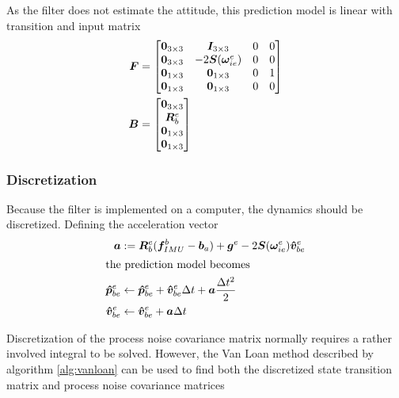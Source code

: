     As the filter does not estimate the attitude, this prediction model is linear with transition and input matrix
    \begin{align}
        \bm{F} &= 
        \begin{bmatrix}
            \bm{0}_{3\times3} & \bm{I}_{3\times3}          & 0 & 0\\
            \bm{0}_{3\times3} & -2\bm{S}(\bm{\omega}_{ie}^e) & 0 & 0\\
            \bm{0}_{1\times3} & \bm{0}_{1\times3}     & 0 & 1\\
            \bm{0}_{1\times3} & \bm{0}_{1\times3}     & 0 & 0
        \end{bmatrix}\\
        \bm{B} &= 
        \begin{bmatrix}
            \bm{0}_{3\times3}\\
            \bm{R}^e_b\\
            \bm{0}_{1\times3}\\
            \bm{0}_{1\times3}
        \end{bmatrix}
    \end{align}
    
\subsubsection{Discretization}
    Because the filter is implemented on a computer, the dynamics should be discretized. Defining the acceleration vector
    \begin{align}
        \bm{a} &:= \bm{R}^e_b(\bm{f}_{IMU}^b - \bm{b}_a) + \bm{g}^e - 2\bm{S}(\bm{\omega}_{ie}^e)\bm{\hat{v}}^e_{be}\\
        \intertext{the prediction model becomes}
        \bm{\hat{p}}^e_{be} &\leftarrow \bm{\hat{p}}^e_{be} + \bm{\hat{v}}^e_{be}\Delta t + \bm{a}\frac{\Delta t^2}{2}\\
        \bm{\hat{v}}^e_{be} &\leftarrow \bm{\hat{v}}^e_{be} + \bm{a}\Delta t
    \end{align}
    
    Discretization of the process noise covariance matrix normally requires a rather involved integral to be solved. However, the Van Loan method described by algorithm \ref{alg:vanloan} can be used to find both the discretized state transition matrix and process noise covariance matrices \cite{van1978computing}

